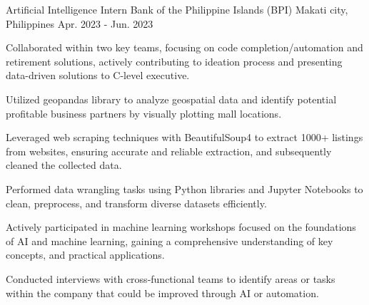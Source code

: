 

\begin{cventries}

  \cventry
    {Artificial Intelligence Intern} %
    {Bank of the Philippine Islands (BPI)} %
    {Makati city, Philippines} %
    {Apr. 2023 - Jun. 2023} %
    {
      \begin{cvitems} %
        \item {Collaborated within two key teams, focusing on code completion/automation and retirement solutions, actively contributing to ideation process and presenting data-driven solutions to C-level executive.}
        \item { Utilized geopandas library to analyze geospatial data and identify potential profitable business partners by visually plotting mall locations.}
        \item {Leveraged web scraping techniques with BeautifulSoup4 to extract 1000+ listings from websites, ensuring accurate and reliable extraction, and subsequently cleaned the collected data.}
        \item {Performed data wrangling tasks using Python libraries and Jupyter Notebooks to clean, preprocess, and transform diverse datasets efficiently.}
        \item {Actively participated in machine learning workshops focused on the foundations of AI and machine learning, gaining a comprehensive understanding of key concepts, and practical applications.}
        \item {Conducted interviews with cross-functional teams to identify areas or tasks within the company that could be improved through AI or automation.}
      \end{cvitems}
    }


\end{cventries}
